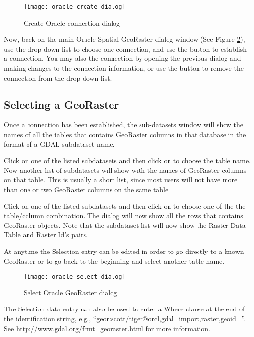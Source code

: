 \begin{figure}[ht]
   \centering
   \caption{Create Oracle connection dialog \nixcaption}\label{fig:oracle_create}
   \texttt{[image: oracle\_create\_dialog]}
\end{figure}

Now, back on the main Oracle Spatial GeoRaster dialog window (See Figure \ref{fig:oracle_select}), use the 
drop-down list to choose one connection, and use the  button to establish a connection. You 
may also  the connection by opening the previous dialog and making changes to the connection 
information, or use the  button to remove the connection from the drop-down list.

\subsection{Selecting a GeoRaster}

Once a connection has been established, the sub-datasets window will show the names of all the tables that 
contains GeoRaster columns in that database in the format of a GDAL subdataset name.

Click on one of the listed subdatasets and then click on  to choose the table name. Now another 
list of subdatasets will show with the names of GeoRaster columns on that table. This is usually a short list, 
since most users will not have more than one or two GeoRaster columns on the same table.

Click on one of the listed subdatasets and then click on  to choose one of the the table/column 
combination. The dialog will now show all the rows that contains GeoRaster objects. Note that the subdataset 
list will now show the Raster Data Table and Raster Id's pairs.

At anytime the Selection entry can be edited in order to go directly to a known GeoRaster or to go back to the 
beginning and select another table name.

\begin{figure}[ht]
   \centering
   \caption{Select Oracle GeoRaster dialog \nixcaption}\label{fig:oracle_select}
   \texttt{[image: oracle\_select\_dialog]}
\end{figure}

The Selection data entry can also be used to enter a Where clause at the end of the  identification string, e.g., 
``geor:scott/tiger@orcl,gdal\_import,raster,geoid=''. See \url{http://www.gdal.org/frmt_georaster.html} for more information.

